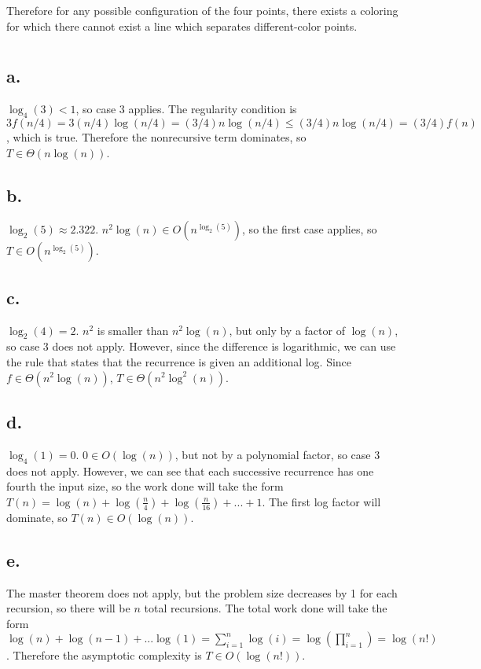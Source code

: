 \documentclass[11pt]{article}
\begin{document}
Therefore for any possible configuration of the four points, there exists a coloring for which there cannot exist a line which separates different-color points.

\section{}
\subsection*{a.}
$\log_4(3) < 1$, so case 3 applies. The regularity condition is $3f(n/4) = 3(n/4)\log(n/4) = (3/4)n\log(n/4) \leq (3/4)n\log(n/4) = (3/4)f(n)$, which is true. Therefore the nonrecursive term dominates, so $T \in \Theta(n\log(n))$. 
\subsection*{b.}
$\log_2(5) \approx 2.322$. $n^2\log(n) \in O(n^{\log_2(5)})$, so the first case applies, so $T \in O(n^{\log_2(5)})$.
\subsection*{c.}
$\log_2(4) = 2$. $n^2$ is smaller than $n^2\log(n)$, but only by a factor of $\log(n)$, so case 3 does not apply. However, since the difference is logarithmic, we can use the rule that states that the recurrence is given an additional log. Since $f \in \Theta(n^2\log(n))$, $T \in \Theta(n^2\log^2(n))$.
\subsection*{d.}
$\log_4(1) = 0$. $0 \in O(\log(n))$, but not by a polynomial factor, so case 3 does not apply. However, we can see that each successive recurrence has one fourth the input size, so the work done will take the form $T(n) = \log(n) + \log(\frac{n}{4}) + \log(\frac{n}{16}) + ... + 1$. The first log factor will dominate, so $T(n) \in O(\log(n))$. \\ 
\subsection*{e.}
The master theorem does not apply, but the problem size decreases by 1 for each recursion, so there will be $n$ total recursions. The total work done will take the form $\log(n) + \log(n-1) + ... \log(1) = \sum_{i=1}^n\log(i) = \log(\prod_{i=1}^n) = \log(n!)$. Therefore the asymptotic complexity is $T \in O(\log(n!))$.
\end{document}
